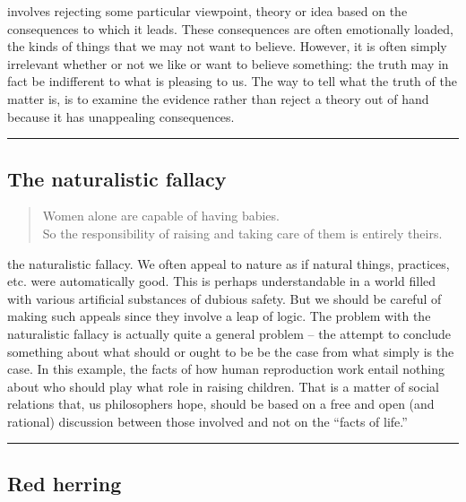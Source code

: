 \documentclass[justified]{tufte-book}
\newenvironment{argument}{\begin{quote}\normalsize}{\end{quote}}
\begin{document}
 involves rejecting some particular viewpoint, theory or idea based on the consequences to which it leads. These consequences are often emotionally loaded, the kinds of things that we may not want to believe. However, it is often simply irrelevant whether or not we like or want to believe something: the truth may in fact be indifferent to what is pleasing to us. The way to tell what the truth of the matter is, is to examine the evidence rather than reject a theory out of hand because it has unappealing consequences.

\begin{center}\rule{0.5\linewidth}{\linethickness}\end{center}

\hypertarget{the-naturalistic-fallacy}{%
\subsection*{The naturalistic fallacy}\label{the-naturalistic-fallacy}}

\begin{argument}
Women alone are capable of having babies.\\
So the responsibility of raising and taking care of them is entirely
theirs.
\end{argument}

 the naturalistic fallacy. We often appeal to nature as if natural things, practices, etc. were automatically good. This is perhaps understandable in a world filled with various artificial substances of dubious safety. But we should be careful of making such appeals since they involve a leap of logic. The problem with the naturalistic fallacy is actually quite a general problem -- the attempt to conclude something about what should or ought to be be the case from what simply is the case. In this example, the facts of how human reproduction work entail nothing about who should play what role in raising children. That is a matter of social relations that, us philosophers hope, should be based on a free and open (and rational) discussion between those involved and not on the ``facts of life.''

\begin{center}\rule{0.5\linewidth}{\linethickness}\end{center}

\hypertarget{red-herring}{%
\subsection*{Red herring}\label{red-herring}}
\end{document}
